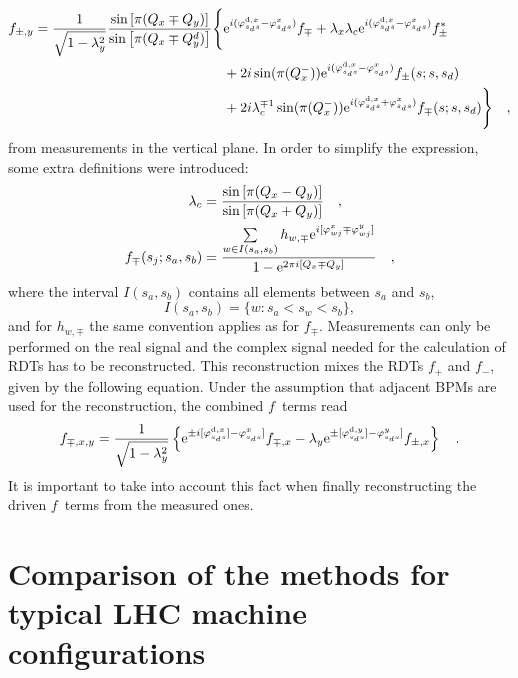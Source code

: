 \begin{align}
    f_{\pm,y} = \frac{1}{\sqrt{1-\lambda_y^2}}
        \frac{
            \sin\left[\pi(Q_x\mp Q_y)\right]
        }{
            \sin\left[\pi(Q_x\mp Q^{d}_{y})\right]
        }
        \Bigg\{&
        \text{e}^{i(\varphi_{s_ds}^{\text{d},x} - \varphi_{s_ds}^{x} )} f_{\mp}
        +\lambda_x \lambda_c \text{e}^{i(\varphi_{s_ds}^{\text{d},x} - \varphi_{s_ds}^{x} )}f_{\pm}^*
        \notag \\
        & +2i \sin(\pi(Q_x^-))\text{e}^{i(\varphi_{s_ds}^{\text{d},x} - \varphi_{s_ds}^{x} )}f_{\pm}(s;s,s_d)
        \notag \\
        & +2i \lambda_c^{\mp 1} \sin(\pi(Q_x^-))\text{e}^{i(\varphi_{s_ds}^{\text{d},x} + \varphi_{s_ds}^{x} )}f_{\mp}(s;s,s_d)
        \Bigg\}
        \quad ,
        \label{eq_drv_cpl_f_ryo}
\end{align}
%
from measurements in the vertical plane.
In order to simplify the expression, some extra definitions were introduced:
%
\begin{align}
    \lambda_c &= \frac{\sin\left[\pi(Q_x-Q_y)\right]}{\sin\left[\pi(Q_x+Q_y)\right]}\quad ,
    \notag \\
    f_{\mp}(s_j;s_a,s_b) &= \frac{
        \sum\limits_{w\in I(s_a,s_b)} h_{w,\mp}\text{e}^{i[\varphi_{wj}^x \mp \varphi_{wj}^y]}
    }{
        1-\text{e}^{2\pi i [Q_x\mp Q_y]}
    }\quad ,
\end{align}
%
where the interval $I(s_a,s_b)$  contains all elements between $s_a$ and $s_b$,
%
\begin{equation}
    I(s_a,s_b) = \{w: s_a < s_w < s_b\},
\end{equation}
%
and for $h_{w,\mp}$ the same convention applies as for $f_\mp$.
Measurements can only be performed on the real signal and the complex signal needed for the calculation
of RDTs has to be reconstructed.  
This reconstruction mixes the RDTs $f_+$ and $f_-$, given by the following equation. Under the assumption
that adjacent BPMs are used for the reconstruction, the combined $f$~terms read
%
\begin{align}
   f_{\mp,x,y} = \frac{1}{\sqrt{1-\lambda_y^2}}
   \left\{
       \text{e}^{\pm i [\varphi^{\text{d},x}_{s_ds}] - \varphi^{x}_{s_ds}]}f_{\mp,x}
       - \lambda_y\text{e}^{\pm[\varphi^{\text{d},y}_{s_ds}] - \varphi^{y}_{s_ds}]}f_{\pm,x}
    \right\}
    \quad .
\end{align}
%
It is important to take into account this fact when finally reconstructing the driven $f$~terms from
the measured ones.

\section{Comparison of the methods for typical LHC machine configurations}

